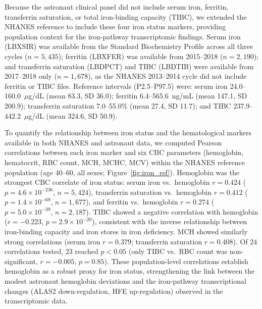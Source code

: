 \documentclass[11pt,a4paper]{article}
\begin{document}
Because the astronaut clinical panel did not include serum iron, ferritin, transferrin saturation, or total iron-binding capacity (TIBC), we extended the NHANES reference to include these four iron status markers, providing population context for the iron-pathway transcriptomic findings. Serum iron (LBXSIR) was available from the Standard Biochemistry Profile across all three cycles ($n = 5{,}435$); ferritin (LBXFER) was available from 2015--2018 ($n = 2{,}190$); and transferrin saturation (LBDPCT) and TIBC (LBDTIB) were available from 2017--2018 only ($n = 1{,}678$), as the NHANES 2013--2014 cycle did not include ferritin or TIBC files. Reference intervals (P2.5--P97.5) were: serum iron 24.0--160.0~$\mu$g/dL (mean 83.3, SD 36.0); ferritin 6.4--565.6~ng/mL (mean 147.1, SD 200.9); transferrin saturation 7.0--55.0\% (mean 27.4, SD 11.7); and TIBC 237.9--442.2~$\mu$g/dL (mean 324.6, SD 50.9).

To quantify the relationship between iron status and the hematological markers available in both NHANES and astronaut data, we computed Pearson correlations between each iron marker and six CBC parameters (hemoglobin, hematocrit, RBC count, MCH, MCHC, MCV) within the NHANES reference population (age 40--60, all sexes; Figure~\ref{fig:iron_ref}). Hemoglobin was the strongest CBC correlate of iron status: serum iron vs.\ hemoglobin $r = 0.424$ ($p = 4.6 \times 10^{-236}$, $n = 5{,}424$), transferrin saturation vs.\ hemoglobin $r = 0.412$ ($p = 1.4 \times 10^{-69}$, $n = 1{,}677$), and ferritin vs.\ hemoglobin $r = 0.274$ ($p = 5.0 \times 10^{-39}$, $n = 2{,}187$). TIBC showed a negative correlation with hemoglobin ($r = -0.223$, $p = 2.9 \times 10^{-20}$), consistent with the inverse relationship between iron-binding capacity and iron stores in iron deficiency. MCH showed similarly strong correlations (serum iron $r = 0.379$; transferrin saturation $r = 0.408$). Of 24 correlations tested, 23 reached $p < 0.05$ (only TIBC vs.\ RBC count was non-significant, $r = -0.005$, $p = 0.85$). These population-level correlations establish hemoglobin as a robust proxy for iron status, strengthening the link between the modest astronaut hemoglobin deviations and the iron-pathway transcriptional changes (ALAS2 down-regulation, HFE up-regulation) observed in the transcriptomic data.
\end{document}
